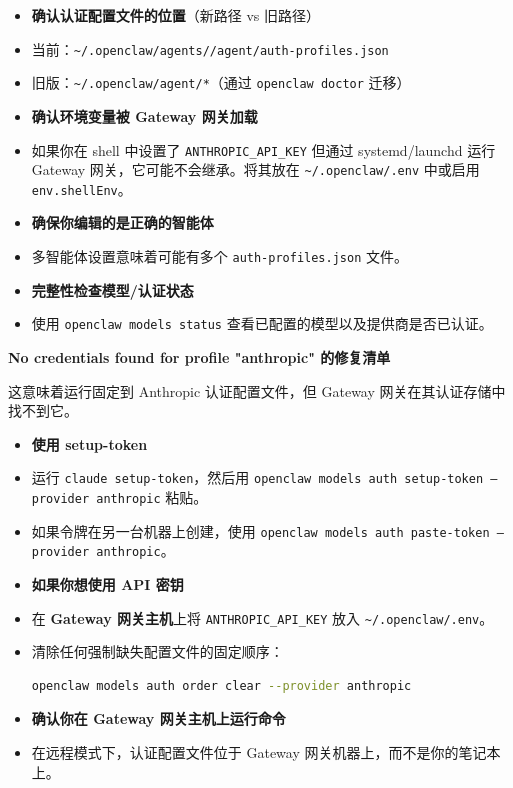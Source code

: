\begin{itemize}
  \item \textbf{确认认证配置文件的位置}（新路径 vs 旧路径）
  \item 当前：\texttt{\textasciitilde{}/.openclaw/agents//agent/auth-profiles.json}
  \item 旧版：\texttt{\textasciitilde{}/.openclaw/agent/*}（通过 \texttt{openclaw doctor} 迁移）
  \item \textbf{确认环境变量被 Gateway 网关加载}
  \item 如果你在 shell 中设置了 \texttt{ANTHROPIC\_API\_KEY} 但通过 systemd/launchd 运行 Gateway 网关，它可能不会继承。将其放在 \texttt{\textasciitilde{}/.openclaw/.env} 中或启用 \texttt{env.shellEnv}。
  \item \textbf{确保你编辑的是正确的智能体}
  \item 多智能体设置意味着可能有多个 \texttt{auth-profiles.json} 文件。
  \item \textbf{完整性检查模型/认证状态}
  \item 使用 \texttt{openclaw models status} 查看已配置的模型以及提供商是否已认证。
\end{itemize}


\textbf{No credentials found for profile "anthropic" 的修复清单}

这意味着运行固定到 Anthropic 认证配置文件，但 Gateway 网关在其认证存储中找不到它。

\begin{itemize}
  \item \textbf{使用 setup-token}
  \item 运行 \texttt{claude setup-token}，然后用 \texttt{openclaw models auth setup-token --provider anthropic} 粘贴。
  \item 如果令牌在另一台机器上创建，使用 \texttt{openclaw models auth paste-token --provider anthropic}。
  \item \textbf{如果你想使用 API 密钥}
  \item 在 \textbf{Gateway 网关主机}上将 \texttt{ANTHROPIC\_API\_KEY} 放入 \texttt{\textasciitilde{}/.openclaw/.env}。
  \item 清除任何强制缺失配置文件的固定顺序：
\begin{lstlisting}[language=bash]
    openclaw models auth order clear --provider anthropic
\end{lstlisting}

  \item \textbf{确认你在 Gateway 网关主机上运行命令}
  \item 在远程模式下，认证配置文件位于 Gateway 网关机器上，而不是你的笔记本上。
\end{itemize}


